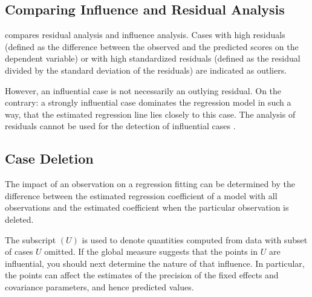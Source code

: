 \documentclass[12pt, a4paper]{report}
\theoremstyle{definition}
\theoremstyle{remark}
\begin{document}

\subsection{Comparing Influence and Residual Analysis}

\citet{influenceLME4} compares residual analysis and influence analysis. Cases with high residuals (defined as the difference between the observed and the predicted scores on the dependent
variable) or with high standardized residuals (defined as the residual divided by the standard deviation
of the residuals) are indicated as outliers.

However, an influential case is not necessarily an outlying residual. On the contrary: a strongly influential case dominates
the regression model in such a way, that the estimated regression line lies closely to this case. The analysis of residuals cannot be used for the detection of influential cases \citep{crawley2012r}.







\subsection*{Case Deletion}

The impact of an observation on a regression fitting can be determined by the difference between the estimated regression coefficient of a model with all observations and the estimated coefficient when the particular observation is deleted. 

The subscript $(U)$ is used to denote quantities computed from data with subset of cases $U$ omitted.
If the global measure suggests that the points in $U$ are influential, you should next determine the nature of
that influence. In particular, the points can affect the estimates of the precision of the fixed effects and covariance parameters, and hence predicted values.
\end{document}
